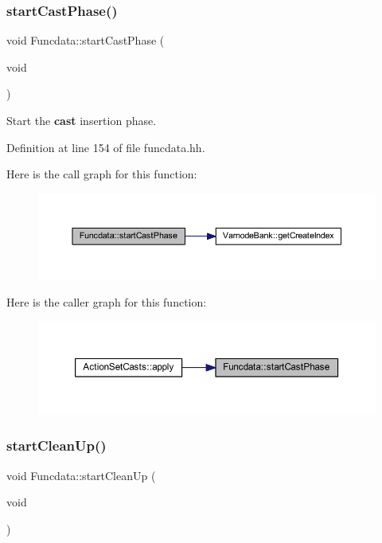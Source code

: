 \subsubsection{\texorpdfstring{startCastPhase()}{startCastPhase()}}
{\footnotesize\ttfamily void Funcdata\+::start\+Cast\+Phase (\begin{DoxyParamCaption}\item[{void}]{ }\end{DoxyParamCaption})\hspace{0.3cm}{\ttfamily [inline]}}



Start the {\bfseries{cast}} insertion phase. 



Definition at line 154 of file funcdata.\+hh.

Here is the call graph for this function\+:
\nopagebreak
\begin{figure}[H]
\begin{center}
\leavevmode
\includegraphics[width=350pt]{class_funcdata_a5f04b2e649dafbd6384d6a5ad7417290_cgraph}
\end{center}
\end{figure}
Here is the caller graph for this function\+:
\nopagebreak
\begin{figure}[H]
\begin{center}
\leavevmode
\includegraphics[width=350pt]{class_funcdata_a5f04b2e649dafbd6384d6a5ad7417290_icgraph}
\end{center}
\end{figure}
\mbox{\label{class_funcdata_a29e446945c2081176890607173cbb461}} 
\subsubsection{\texorpdfstring{startCleanUp()}{startCleanUp()}}
{\footnotesize\ttfamily void Funcdata\+::start\+Clean\+Up (\begin{DoxyParamCaption}\item[{void}]{ }\end{DoxyParamCaption})\hspace{0.3cm}{\ttfamily [inline]}}



